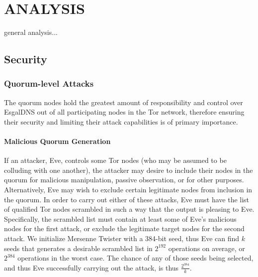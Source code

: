 
\chapter{ANALYSIS}

general analysis...

\section{Security}

\subsection{Quorum-level Attacks}

The quorum nodes hold the greatest amount of responsibility and control over EsgalDNS out of all participating nodes in the Tor network, therefore ensuring their security and limiting their attack capabilities is of primary importance.

\subsubsection{Malicious Quorum Generation}

If an attacker, Eve, controls some Tor nodes (who may be assumed to be colluding with one another), the attacker may desire to include their nodes in the quorum for malicious manipulation, passive observation, or for other purposes. Alternatively, Eve may wish to exclude certain legitimate nodes from inclusion in the quorum. In order to carry out either of these attacks, Eve must have the list of qualified Tor nodes scrambled in such a way that the output is pleasing to Eve. Specifically, the scrambled list must contain at least some of Eve's malicious nodes for the first attack, or exclude the legitimate target nodes for the second attack. We initialize Mersenne Twister with a 384-bit seed, thus Eve can find $ k $ seeds that generates a desirable scrambled list in $ 2^{192} $ operations on average, or $ 2^{384} $ operations in the worst case. The chance of any of those seeds being selected, and thus Eve successfully carrying out the attack, is thus $ \frac{2^{384}}{k} $.

